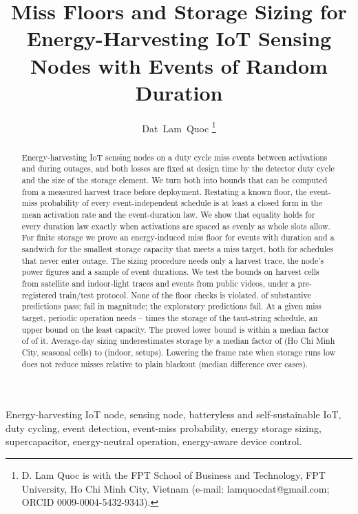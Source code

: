 \documentclass[lettersize,journal]{IEEEtran}
\theoremstyle{definition}
\theoremstyle{remark}
\begin{document}
\title{Miss Floors and Storage Sizing for Energy-Harvesting IoT Sensing Nodes with Events of Random Duration}
\author{Dat~Lam~Quoc%
\thanks{D. Lam Quoc is with the FPT School of Business and Technology, FPT University, Ho Chi Minh City, Vietnam (e-mail: lamquocdat@gmail.com; ORCID 0009-0004-5432-9343).}}
\maketitle

\begin{abstract}
Energy-harvesting IoT sensing nodes on a duty cycle miss events between activations and during outages, and both losses are fixed at design time by the detector duty cycle and the size of the storage element. We turn both into bounds that can be computed from a measured harvest trace before deployment. Restating a known floor, the event-miss probability of every event-independent schedule is at least a closed form in the mean activation rate and the event-duration law. We show that equality holds for every duration law exactly when activations are spaced as evenly as whole slots allow. For finite storage we prove an energy-induced miss floor for events with duration and a sandwich for the smallest storage capacity that meets a miss target, both for schedules that never enter outage. The sizing procedure needs only a harvest trace, the node's power figures and a sample of event durations. We test the bounds on \nTraceCells{} harvest cells from satellite and indoor-light traces and \nEv{} events from \nVid{} public videos, under a pre-registered train/test protocol. None of the \nFloorChecks{} floor checks is violated. \nSubstPass{} of \nSubst{} substantive predictions pass; \nSubstFail{} fail in magnitude; the \nExpl{} exploratory predictions fail. At a given miss target, periodic operation needs \AiiTsInvLo--\AiiTsInvHi{} times the storage of the taut-string schedule, an upper bound on the least capacity. The proved lower bound is within a median factor of \AiiMedLBTS{} of it. Average-day sizing underestimates storage by a median factor of \avgHCMC{} (Ho Chi Minh City, \nCellHCMC{} seasonal cells) to \avgIn{} (indoor, \nCellIn{} setups). Lowering the frame rate when storage runs low does not reduce misses relative to plain blackout (median difference \thrMedSigned{} over \nThr{} cases).
\end{abstract}

\begin{IEEEkeywords}
Energy-harvesting IoT node, sensing node, batteryless and self-sustainable IoT, duty cycling, event detection, event-miss probability, energy storage sizing, supercapacitor, energy-neutral operation, energy-aware device control.
\end{IEEEkeywords}
\end{document}

